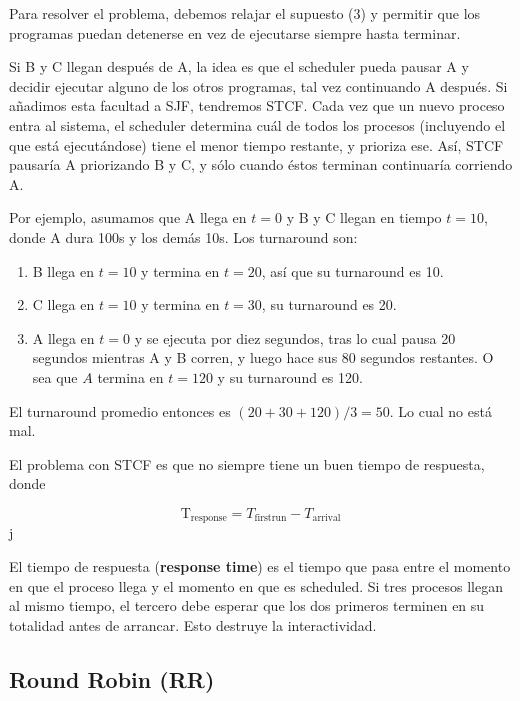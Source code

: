 \documentclass[12pt]{article}
\theoremstyle{definition}
\begin{document}
Para resolver el problema, debemos relajar el supuesto (3) y permitir que los
programas puedan detenerse en vez de ejecutarse siempre hasta terminar.

Si B y C llegan después de A, la idea es que el scheduler pueda pausar A y
decidir ejecutar alguno de los otros programas, tal vez continuando A después.
Si añadimos esta facultad a SJF, tendremos STCF. Cada vez que un nuevo proceso
entra al sistema, el scheduler determina cuál de todos los procesos (incluyendo
el que está ejecutándose) tiene el menor tiempo restante, y prioriza ese. Así, 
STCF pausaría A priorizando B y C, y sólo cuando éstos terminan continuaría
corriendo A.

Por ejemplo, asumamos que A llega en $t = 0$ y B y C llegan en tiempo $t = 10$,
donde A dura 100s y los demás 10s. Los turnaround son:

\begin{enumerate}
    \item B llega en $t=10$ y termina en $t = 20$, así que su turnaround es 10. 
    \item C llega en $t = 10$ y termina en $t = 30$, su turnaround es 20. 
    \item A llega en $t = 0$ y se ejecuta por diez segundos, tras lo cual pausa
        20 segundos mientras A y B corren, y luego hace sus 80 segundos
        restantes. O sea que $A$ termina en $t = 120$ y su turnaround es 120.
\end{enumerate}

El turnaround promedio entonces es $( 20 + 30 + 120 ) / 3 = 50$. Lo cual no está
mal.


El problema con STCF es que no siempre tiene un buen tiempo de respuesta, donde 

\begin{equation*}
    \text{T}_{\text{response}} = T_{\text{firstrun}} - T_{\text{arrival}}
\end{equation*}j


El tiempo de respuesta (\textbf{response time}) es el tiempo que pasa entre el
momento en que el proceso llega y el momento en que es scheduled. Si tres
procesos llegan al mismo tiempo, el tercero debe esperar que los dos primeros
terminen en su totalidad antes de arrancar. Esto destruye la interactividad.

\subsection{Round Robin (RR)}
\end{document}
